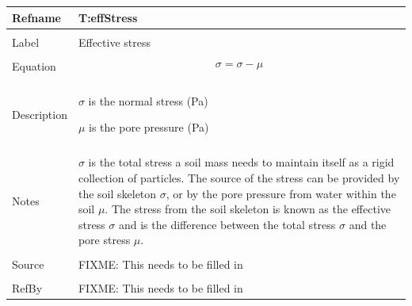 \documentclass[12pt]{article}
\begin{document}
\noindent \begin{minipage}{\textwidth}
\begin{tabular}{p{} p{}}
\toprule \textbf{Refname} & \textbf{T:effStress}
\label{T:effStress}
\\ \midrule \\
Label & Effective stress
\\ \midrule \\
Equation & \begin{dmath}
           σ=σ-μ
           \end{dmath}
\\ \midrule \\
Description & \begin{symbDescription}
              \item{$σ$ is the normal stress (Pa)}
              \item{$μ$ is the pore pressure (Pa)}
              \end{symbDescription}
\\ \midrule \\
Notes & $σ$ is the total stress a soil mass needs to maintain itself as a rigid collection of particles. The source of the stress can be provided by the soil skeleton $σ$, or by the pore pressure from water within the soil $μ$. The stress from the soil skeleton is known as the effective stress $σ$ and is the difference between the total stress $σ$ and the pore stress $μ$.
\\ \midrule \\
Source & FIXME: This needs to be filled in
\\ \midrule \\
RefBy & FIXME: This needs to be filled in
\\ \bottomrule \end{tabular}
\end{minipage}\\
~\newline
\end{document}
